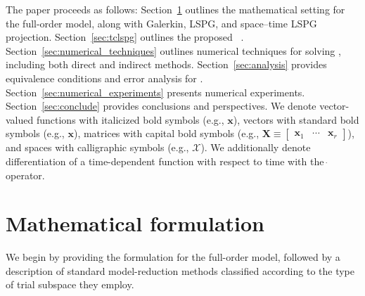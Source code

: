 \documentclass[3p,computermodern,10pt]{elsarticle}
\begin{document}
The paper proceeds as follows: Section~\ref{sec:math}
outlines the mathematical setting for the full-order model, along with Galerkin, LSPG, and
space--time LSPG projection. Section~\ref{sec:tclspg} outlines the proposed \methodAcronym\
\approachKwd. Section~\ref{sec:numerical_techniques}
outlines numerical techniques for solving \methodAcronymROMs, including both direct and
indirect methods. Section~\ref{sec:analysis} provides
equivalence conditions and error analysis for \methodAcronymROMs.
Section~\ref{sec:numerical_experiments} presents numerical experiments.
Section~\ref{sec:conclude} provides conclusions and perspectives.
We denote vector-valued functions with italicized bold symbols (e.g., $\boldsymbol
x$), vectors with standard bold symbols (e.g., $\mathbf{x}$), 
matrices with capital bold symbols (e.g., $\mathbf{X} \equiv \begin{bmatrix}
\mathbf{x}_1 & \cdots & \mathbf{x}_r\end{bmatrix}$), and spaces with
calligraphic symbols (e.g., $\mathcal{X}$). We additionally denote differentiation of a time-dependent 
function with respect to time with the $\dot\ $ operator.
\section{Mathematical formulation}\label{sec:math}
	We begin by providing the formulation for the full-order model,
	followed by a description of standard model-reduction methods
	classified according to the type of trial subspace they employ.
\end{document}
